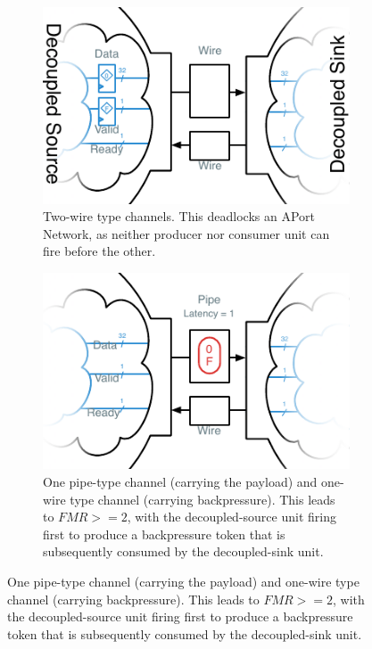 \begin{figure}
    \centering
    \begin{subfigure}[t]{0.49\textwidth}
        \captionsetup{margin=0.25cm}
        \includegraphics[width=\columnwidth]{figures/li-wire-channel-manual.pdf}
        \caption{Two-wire type channels. This deadlocks an APort Network, as neither producer nor consumer unit can fire
        before the other.}
    \end{subfigure}
    \begin{subfigure}[t]{0.49\textwidth}
        \captionsetup{margin=0.25cm}
        \includegraphics[width=\columnwidth]{figures/li-pipe-channel-manual.pdf}
        \caption{One pipe-type channel (carrying the payload) and one-wire type channel (carrying backpressure). This leads to $FMR >= 2$, with the decoupled-source unit
        firing first to produce a backpressure token that is subsequently consumed by the decoupled-sink unit.}

\end{subfigure}
\end{figure}
